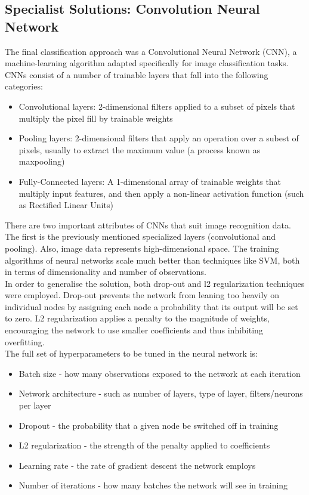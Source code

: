 \documentclass[12pt]{article}
\begin{document}
\subsection{Specialist Solutions: Convolution Neural Network}
The final classification approach was a Convolutional Neural Network (CNN), a machine-learning algorithm adapted specifically for image classification tasks. CNNs consist of a number of trainable layers that fall into the following categories:\\
\begin{itemize}
  \item Convolutional layers: 2-dimensional filters applied to a subset of pixels that multiply the pixel fill by trainable weights
  \item Pooling layers: 2-dimensional filters that apply an operation over a subest of pixels, usually to extract the maximum value (a process known as maxpooling)
  \item Fully-Connected layers: A 1-dimensional array of trainable weights that multiply input features, and then apply a non-linear activation function (such as Rectified Linear Units)
\end{itemize}

There are two important attributes of CNNs that suit image recognition data. The first is the previously mentioned specialized layers (convolutional and pooling). Also, image data represents high-dimensional space. The training algorithms of neural networks scale much better than techniques like SVM, both in terms of dimensionality and number of observations.\\

In order to generalise the solution, both drop-out and l2 regularization techniques were employed. Drop-out prevents the network from leaning too heavily on individual nodes by assigning each node a probability that its output will be set to zero. L2 regularization applies a penalty to the magnitude of weights, encouraging the network to use smaller coefficients and thus inhibiting overfitting.\\

The full set of hyperparameters to be tuned in the neural network is:
\begin{itemize}
\item Batch size - how many observations exposed to the network at each iteration
\item Network architecture - such as  number of layers, type of layer, filters/neurons per layer
\item Dropout - the probability that a given node be switched off in training
\item L2 regularization - the strength of the penalty applied to coefficients
\item Learning rate - the rate of gradient descent the network employs
\item Number of iterations - how many batches the network will see in training
\end{itemize}
\end{document}
